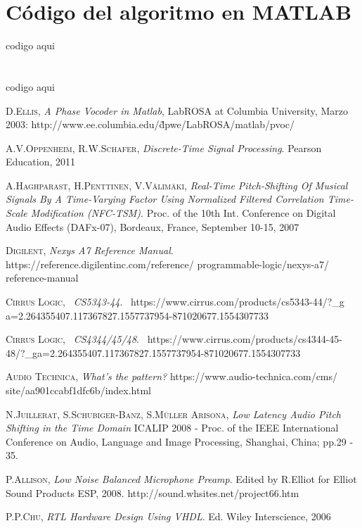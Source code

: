 \documentclass[a4paper, 11pt, oneside, openright]{report}
\begin{document}
\begin{appendices}
\clearpage
{}
\chapter{Código del algoritmo en MATLAB}
codigo aqui
\chapter{}
codigo aqui
\end{appendices}
\begin{thebibliography}{aaa}

	\textsc{D.Ellis},
	\textit{A Phase Vocoder in Matlab},
	LabROSA at Columbia University,
	Marzo 2003: 
	http://www.ee.columbia.edu/\~dpwe/LabROSA/matlab/pvoc/
	
	\textsc{A.V.Oppenheim, R.W.Schafer},
	\textit{Discrete-Time Signal Processing}.
	Pearson Education, 2011
	
	\textsc{A.Haghparast, H.Penttinen, V.Välimäki},
	\textit{Real-Time Pitch-Shifting Of Musical Signals By A Time-Varying Factor Using Normalized Filtered Correlation Time-Scale Modification (NFC-TSM)}.
	Proc. of the 10th Int. Conference on Digital Audio Effects (DAFx-07), Bordeaux, France, September 10-15, 2007
	
	\textsc{Digilent},
	\textit{Nexys A7 Reference Manual}.
	https://reference.digilentinc.com/reference/ programmable-logic/nexys-a7/	  reference-manual
	
	\textsc{Cirrus Logic},~
	\textit{CS5343-44}.~
	https://www.cirrus.com/products/cs5343-44/?\_g a=2.264355407.117367827.1557737954-871020677.1554307733
	
	\textsc{Cirrus Logic},~
	\textit{CS4344/45/48}.~
	https://www.cirrus.com/products/cs4344-45-48/?\_ga=2.264355407.117367827.1557737954-871020677.1554307733
	
	\textsc{Audio Technica},
	\textit{What's the pattern?}
	https://www.audio-technica.com/cms/ site/aa901ccabf1dfc6b/index.html
	
	\textsc{N.Juillerat, S.Schubiger-Banz, S.Müller Arisona},
	\textit{Low Latency Audio Pitch Shifting in the Time Domain}
	ICALIP 2008 - Proc. of the IEEE International Conference on Audio, Language and Image Processing, Shanghai, China; pp.29 - 35.
	
	\textsc{P.Allison},
	\textit{Low Noise Balanced Microphone Preamp}.
	Edited by R.Elliot for	
	Elliot Sound Products ESP, 2008.
	http://sound.whsites.net/project66.htm
	
	\textsc{P.P.Chu},
	\textit{RTL Hardware Design Using VHDL}.
	Ed. Wiley Interscience, 2006
	
\end{thebibliography}
\end{document}
